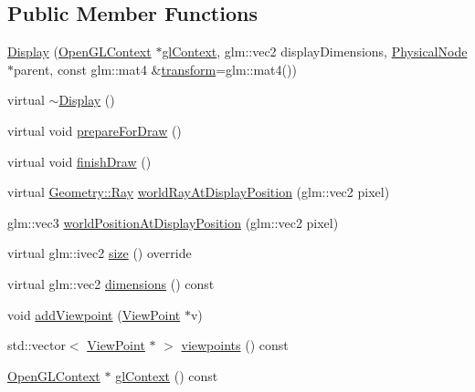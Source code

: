 \subsection*{Public Member Functions}
\begin{DoxyCompactItemize}
\item 
\hyperlink{classmotorcar_1_1Display_a2f7466d55b00caa97751ee242e0c633c}{Display} (\hyperlink{classmotorcar_1_1OpenGLContext}{Open\-G\-L\-Context} $\ast$\hyperlink{classmotorcar_1_1Display_a884dd0b78dbecee82a33eb6d26a2a403}{gl\-Context}, glm\-::vec2 display\-Dimensions, \hyperlink{classmotorcar_1_1PhysicalNode}{Physical\-Node} $\ast$parent, const glm\-::mat4 \&\hyperlink{classmotorcar_1_1SceneGraphNode_ad96e79fdd739ac8223a3128003be391a}{transform}=glm\-::mat4())
\item 
virtual \hyperlink{classmotorcar_1_1Display_ac2607a6bb236c55547a4223d40d85d1f}{$\sim$\-Display} ()
\item 
virtual void \hyperlink{classmotorcar_1_1Display_a0b26d9162f4f8f0848af408791be631c}{prepare\-For\-Draw} ()
\item 
virtual void \hyperlink{classmotorcar_1_1Display_a162b721d9c039887fc37b6a090ff1074}{finish\-Draw} ()
\item 
virtual \hyperlink{structmotorcar_1_1Geometry_1_1Ray}{Geometry\-::\-Ray} \hyperlink{classmotorcar_1_1Display_a9af842ec6ce47cdc901cb0310b0ef126}{world\-Ray\-At\-Display\-Position} (glm\-::vec2 pixel)
\item 
glm\-::vec3 \hyperlink{classmotorcar_1_1Display_ac3a8d4538e88df5b2bee043504620447}{world\-Position\-At\-Display\-Position} (glm\-::vec2 pixel)
\item 
virtual glm\-::ivec2 \hyperlink{classmotorcar_1_1Display_a58a94b72684d5b8569a9169591f7613e}{size} () override
\item 
virtual glm\-::vec2 \hyperlink{classmotorcar_1_1Display_aea90a885c5f3a124a3581bbeeeb4a425}{dimensions} () const 
\item 
void \hyperlink{classmotorcar_1_1Display_abd961f7f80a84ec143a81a159b07f0e8}{add\-Viewpoint} (\hyperlink{classmotorcar_1_1ViewPoint}{View\-Point} $\ast$v)
\item 
std\-::vector$<$ \hyperlink{classmotorcar_1_1ViewPoint}{View\-Point} $\ast$ $>$ \hyperlink{classmotorcar_1_1Display_acb3f10cbf366d80551f16e224e0bdf73}{viewpoints} () const 
\item 
\hyperlink{classmotorcar_1_1OpenGLContext}{Open\-G\-L\-Context} $\ast$ \hyperlink{classmotorcar_1_1Display_a884dd0b78dbecee82a33eb6d26a2a403}{gl\-Context} () const 

\end{DoxyCompactItemize}
